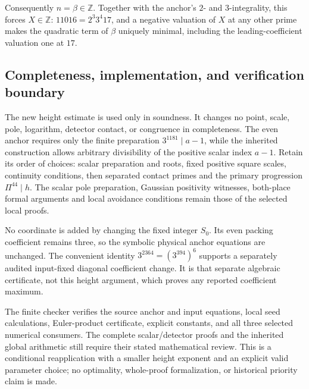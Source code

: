 Consequently $n=\beta\in\mathbb Z$. Together with the anchor's
$2$- and $3$-integrality, this forces $X\in\mathbb Z$:
$11016=2^3 3^4 17$, and a negative valuation of $X$ at any other
prime makes the quadratic term of $\beta$ uniquely minimal, including
the leading-coefficient valuation one at $17$.

\subsection{Completeness, implementation, and verification boundary}

The new height estimate is used only in soundness. It changes no point,
scale, pole, logarithm, detector contact, or congruence in completeness.
The even anchor requires only the finite preparation
$3^{1181}\mid a-1$, while the inherited construction allows arbitrary
divisibility of the positive scalar index $a-1$. Retain its order of
choices: scalar preparation and roots, fixed positive square scales,
continuity conditions, then separated contact primes and the primary
progression $\Pi^{44}\mid h$. The scalar pole preparation, Gaussian
positivity witnesses, both-place formal arguments and local avoidance
conditions remain those of the selected local proofs.

No coordinate is added by changing the fixed integer $S_0$.
Its even packing coefficient remains three, so the symbolic physical
anchor equations are unchanged. The convenient identity
$3^{2364}=(3^{394})^6$ supports a separately audited input-fixed
diagonal coefficient change. It is that separate algebraic certificate,
not this height argument, which proves any reported coefficient maximum.

The finite checker verifies the source anchor and input equations, local
seed calculations, Euler-product certificate, explicit constants, and
all three selected numerical consumers. The complete scalar/detector
proofs and the inherited global arithmetic still require their stated
mathematical review. This is a conditional reapplication with a smaller
height exponent and an explicit valid parameter choice; no optimality,
whole-proof formalization, or historical priority claim is made.
